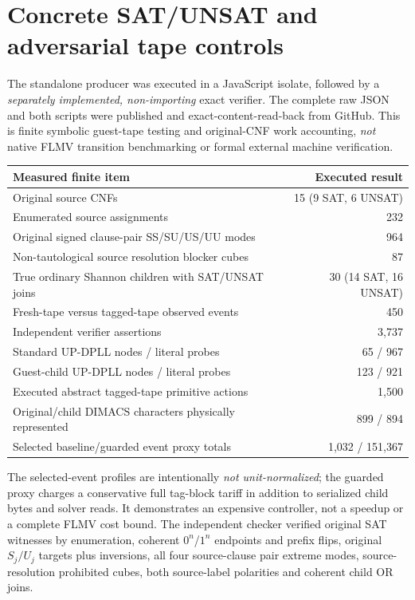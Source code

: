 \documentclass[11pt]{article}
\begin{document}
\section{Concrete SAT/UNSAT and adversarial tape controls}
The standalone producer was executed in a JavaScript isolate, followed by a \emph{separately implemented, non-importing} exact verifier. The complete raw JSON and both scripts were published and exact-content-read-back from GitHub. This is finite symbolic guest-tape testing and original-CNF work accounting, \emph{not} native FLMV transition benchmarking or formal external machine verification.

\begin{center}\small
\begin{tabular}{lr}
\toprule
Measured finite item & Executed result\\\midrule
Original source CNFs & 15 (9 SAT, 6 UNSAT)\\
Enumerated source assignments & 232\\
Original signed clause-pair SS/SU/US/UU modes & 964\\
Non-tautological source resolution blocker cubes & 87\\
True ordinary Shannon children with SAT/UNSAT joins & 30 (14 SAT, 16 UNSAT)\\
Fresh-tape versus tagged-tape observed events & 450\\
Independent verifier assertions & 3,737\\
Standard UP-DPLL nodes / literal probes & 65 / 967\\
Guest-child UP-DPLL nodes / literal probes & 123 / 921\\
Executed abstract tagged-tape primitive actions & 1,500\\
Original/child DIMACS characters physically represented & 899 / 894\\
Selected baseline/guarded event proxy totals & 1,032 / 151,367\\\bottomrule
\end{tabular}
\end{center}
The selected-event profiles are intentionally \emph{not unit-normalized}; the guarded proxy charges a conservative full tag-block tariff in addition to serialized child bytes and solver reads. It demonstrates an expensive controller, not a speedup or a complete FLMV cost bound. The independent checker verified original SAT witnesses by enumeration, coherent $0^n$/$1^n$ endpoints and prefix flips, original $S_j/U_j$ targets plus inversions, all four source-clause pair extreme modes, source-resolution prohibited cubes, both source-label polarities and coherent child OR joins.
\end{document}
